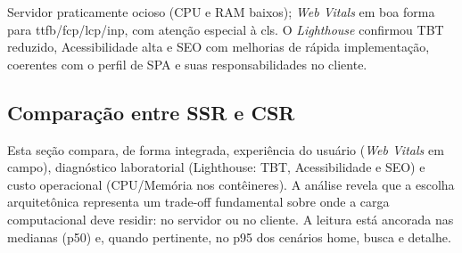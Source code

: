 {Servidor praticamente ocioso (CPU e RAM baixos); \emph{Web Vitals} em boa forma para \acrshort{ttfb}/\acrshort{fcp}/\acrshort{lcp}/\acrshort{inp}, com atenção especial à \acrshort{cls}. O \emph{Lighthouse} confirmou TBT reduzido, Acessibilidade alta e SEO com melhorias de rápida implementação, coerentes com o perfil de SPA e suas responsabilidades no cliente.

\subsection{Comparação entre SSR e CSR}
\label{subsec:comparacao-ssr-csr}

Esta seção compara, de forma integrada, experiência do usuário (\emph{Web Vitals} em campo), diagnóstico laboratorial (Lighthouse: TBT, Acessibilidade e SEO) e custo operacional (CPU/Memória nos contêineres). A análise revela que a escolha arquitetônica representa um trade-off fundamental sobre onde a carga computacional deve residir: no servidor ou no cliente. A leitura está ancorada nas medianas (p50) e, quando pertinente, no p95 dos cenários home, busca e detalhe.

}
